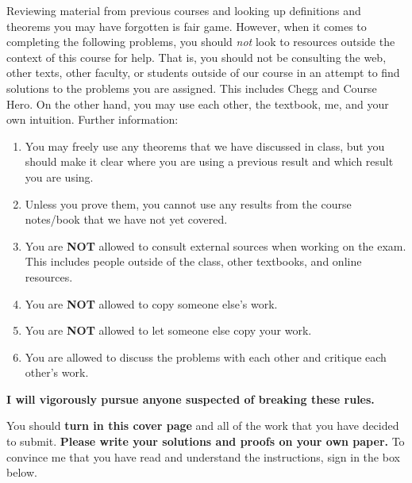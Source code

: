 \documentclass[11pt]{article}
\theoremstyle{definition}
\begin{document}
\bigskip

Reviewing material from previous courses and looking up definitions and theorems you may have forgotten is fair game. However, when it comes to completing the following problems, you should \emph{not} look to resources outside the context of this course for help.  That is, you should not be consulting the web, other texts, other faculty, or students outside of our course in an attempt to find solutions to the problems you are assigned.  This includes Chegg and Course Hero. On the other hand, you may use each other, the textbook, me, and your own intuition. Further information:
\begin{enumerate}
\item You may freely use any theorems that we have discussed in class, but you should make it clear where you are using a previous result and which result you are using.  %
\item Unless you prove them, you cannot use any results from the course notes/book that we have not yet covered.
\item You are \textbf{NOT} allowed to consult external sources when working on the exam.  This includes people outside of the class, other textbooks, and online resources.
\item You are \textbf{NOT} allowed to copy someone else's work.
\item You are \textbf{NOT} allowed to let someone else copy your work.
\item You are allowed to discuss the problems with each other and critique each other's work.
\end{enumerate}

\begin{center}
\textbf{I will vigorously pursue anyone suspected of breaking these rules.}
\end{center}

You should \textbf{turn in this cover page} and all of the work that you have decided to submit. \textbf{Please write your solutions and proofs on your own paper.} To convince me that you have read and understand the instructions, sign in the box below.

\bigskip


\bigskip
\end{document}
